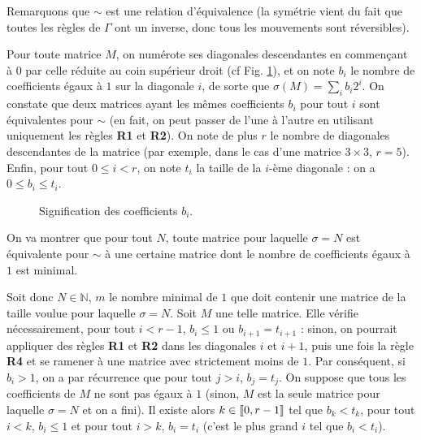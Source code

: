 \documentclass[11pt, openany]{article}
\newcommand{\cg }{[\kern-0.15em [}
\newcommand{\cd}{]\kern-0.15em]}
\newcommand{\N}{\mathbb{N}}
\newcommand\tikzmark[1]{%
  \tikz[overlay,remember picture,baseline] 
  \node[anchor=base](#1){};}
\begin{document}
Remarquons que $\sim$ est une relation d'équivalence (la symétrie vient du fait que toutes les règles de $\Gamma$ ont un inverse, donc tous les mouvements sont réversibles).

Pour toute matrice $M$, on numérote ses diagonales descendantes en commençant à $0$ par celle réduite au coin supérieur droit (cf Fig. \ref{fig:diags}), et on note $b_i$ le nombre de coefficients égaux à $1$ sur la diagonale $i$, de sorte que $\sigma (M) = \sum\limits_ib_i2^i$. On constate que deux matrices ayant les mêmes coefficients $b_i$ pour tout $i$ sont équivalentes pour $\sim$ (en fait, on peut passer de l'une à l'autre en utilisant uniquement les règles \textbf{R1} et \textbf{R2}). On note de plus $r$ le nombre de diagonales descendantes de la matrice (par exemple, dans le cas d'une matrice $3\times 3$, $r=5$). Enfin, pour tout $0\leq i < r$, on note $t_i$ la taille de la $i$-ème diagonale : on a $0\leq b_i \leq t_i$. 
 


\begin{figure}[hbt]
\centering


\caption{Signification des coefficients $b_i$.}
\label{fig:diags}
\end{figure}

On va montrer que pour tout $N$, toute matrice pour laquelle $\sigma=N$ est équivalente pour $\sim$ à une certaine matrice dont le nombre de coefficients égaux à $1$ est minimal.  

Soit donc $N \in \N$, $m$ le nombre minimal de $1$ que doit contenir une matrice de la taille voulue pour laquelle $\sigma=N$. Soit $M$ une telle matrice. Elle vérifie nécessairement, pour tout $i<r-1$, $b_i \leq 1$ ou $b_{i+1}=t_{i+1}$ : sinon, on pourrait appliquer des règles \textbf{R1} et \textbf{R2} dans les diagonales $i$ et $i+1$, puis une fois la règle \textbf{R4} et se ramener à une matrice avec strictement moins de $1$.
Par conséquent, si $b_i > 1$, on a par récurrence que pour tout $j>i$, $b_j = t_j$.
On suppose que tous les coefficients de $M$ ne sont pas égaux à $1$ (sinon, $M$ est la seule matrice pour laquelle $\sigma = N$ et on a fini).
Il existe alors $k \in \cg 0, r-1 \cd$ tel que $b_k<t_k$, pour tout  $i<k$, $b_i \leq 1$ et pour tout $i>k$, $b_i=t_i$ (c'est le plus grand $i$ tel que $b_i < t_i$).
\end{document}
